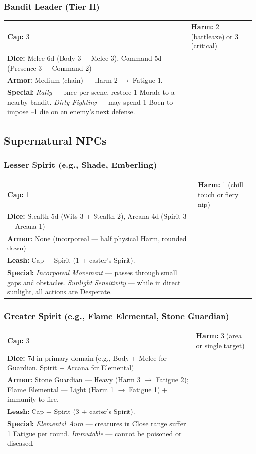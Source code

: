 \subsubsection{Bandit Leader (Tier II)}
\vspace{0.2em}
\begin{tabular}{@{}ll@{}}
\textbf{Cap:} 3 & \textbf{Harm:} 2 (battleaxe) or 3 (critical) \\
\textbf{Dice:} Melee 6d (Body 3 + Melee 3), Command 5d (Presence 3 + Command 2) \\
\textbf{Armor:} Medium (chain) --- Harm 2 $\rightarrow$ Fatigue 1. \\
\textbf{Special:} \textit{Rally} --- once per scene, restore 1 Morale to a nearby bandit. \textit{Dirty Fighting} --- may spend 1 Boon to impose --1 die on an enemy's next defense.
\end{tabular}

\subsection{Supernatural NPCs}

\subsubsection{Lesser Spirit (e.g., Shade, Emberling)}
\vspace{0.2em}
\begin{tabular}{@{}ll@{}}
\textbf{Cap:} 1 & \textbf{Harm:} 1 (chill touch or fiery nip) \\
\textbf{Dice:} Stealth 5d (Wits 3 + Stealth 2), Arcana 4d (Spirit 3 + Arcana 1) \\
\textbf{Armor:} None (incorporeal --- half physical Harm, rounded down) \\
\textbf{Leash:} Cap + Spirit (1 + caster's Spirit). \\
\textbf{Special:} \textit{Incorporeal Movement} --- passes through small gaps and obstacles. \textit{Sunlight Sensitivity} --- while in direct sunlight, all actions are Desperate.
\end{tabular}

\subsubsection{Greater Spirit (e.g., Flame Elemental, Stone Guardian)}
\vspace{0.2em}
\begin{tabular}{@{}ll@{}}
\textbf{Cap:} 3 & \textbf{Harm:} 3 (area or single target) \\
\textbf{Dice:} 7d in primary domain (e.g., Body + Melee for Guardian, Spirit + Arcana for Elemental) \\
\textbf{Armor:} Stone Guardian --- Heavy (Harm 3 $\rightarrow$ Fatigue 2); Flame Elemental --- Light (Harm 1 $\rightarrow$ Fatigue 1) + immunity to fire. \\
\textbf{Leash:} Cap + Spirit (3 + caster's Spirit). \\
\textbf{Special:} \textit{Elemental Aura} --- creatures in Close range suffer 1 Fatigue per round. \textit{Immutable} --- cannot be poisoned or diseased.
\end{tabular}

